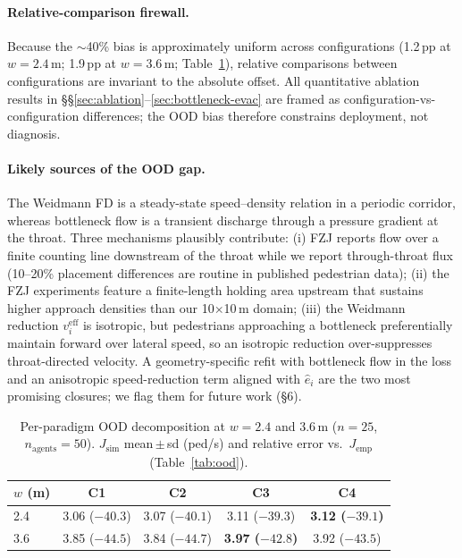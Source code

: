 \documentclass[a4paper,twoside]{article}
\begin{document}
\paragraph{Relative-comparison firewall.} Because the $\sim$40\% bias is approximately uniform across configurations (1.2\,pp at $w=2.4$\,m; 1.9\,pp at $w=3.6$\,m; Table~\ref{tab:ood-per-paradigm}), relative comparisons between configurations are invariant to the absolute offset. All quantitative ablation results in \S\S\ref{sec:ablation}--\ref{sec:bottleneck-evac} are framed as configuration-vs-configuration differences; the OOD bias therefore constrains deployment, not diagnosis.

\paragraph{Likely sources of the OOD gap.} The Weidmann FD is a steady-state speed--density relation in a periodic corridor, whereas bottleneck flow is a transient discharge through a pressure gradient at the throat. Three mechanisms plausibly contribute: (i) FZJ reports flow over a finite counting line downstream of the throat while we report through-throat flux (10--20\% placement differences are routine in published pedestrian data); (ii) the FZJ experiments feature a finite-length holding area upstream that sustains higher approach densities than our 10$\times$10\,m domain; (iii) the Weidmann reduction $v^{\mathrm{eff}}_i$ is isotropic, but pedestrians approaching a bottleneck preferentially maintain forward over lateral speed, so an isotropic reduction over-suppresses throat-directed velocity. A geometry-specific refit with bottleneck flow in the loss and an anisotropic speed-reduction term aligned with $\hat{e}_i$ are the two most promising closures; we flag them for future work (§6).

\begin{table}[h]
\caption{Per-paradigm OOD decomposition at $w=2.4$ and $3.6$\,m ($n=25$, $n_{\mathrm{agents}}=50$). $J_{\mathrm{sim}}$ mean\,$\pm$\,sd (ped/s) and relative error vs.\ $J_{\mathrm{emp}}$ (Table~\ref{tab:ood}).}\label{tab:ood-per-paradigm}
\centering\scriptsize
\setlength{\tabcolsep}{3pt}
\begin{tabular}{@{}lcccc@{}}
\toprule
$w$ (m) & C1 & C2 & C3 & C4 \\
\midrule
2.4 & 3.06 ($-40.3$) & 3.07 ($-40.1$) & 3.11 ($-39.3$) & \textbf{3.12 ($-39.1$)} \\
3.6 & 3.85 ($-44.5$) & 3.84 ($-44.7$) & \textbf{3.97 ($-42.8$)} & 3.92 ($-43.5$) \\
\bottomrule
\end{tabular}
\end{table}
\end{document}
